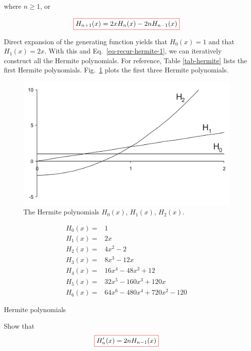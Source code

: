 where $n \geq 1$, or

\begin{equation}
\fbox{$\displaystyle
H_{n+1}(x) = 2 x H_n(x) - 2 n H_{n-1}(x)
$} \label{eq-recur-hermite-1}
\end{equation} 

Direct expansion of the generating function yields that $H_0(x) = 1$ and that $H_1(x) = 2x$. With this and Eq.~\ref{eq-recur-hermite-1}, we can iteratively construct all the Hermite polynomials. For reference, Table \ref{tab-hermite} lists the first Hermite polynomials. Fig.~\ref{fig-hermite} plots the first three Hermite polynomials.

\begin{figure}
\centering
\includegraphics[scale=0.7]{special/figures/hermite}
\caption{The Hermite polynomials $H_0(x)$, $H_1(x)$, $H_2(x)$.}
\label{fig-hermite}
\end{figure}

\begin{table}
\begin{align}
H_0(x) = & 1 \nonumber \\
H_1(x) = & 2x \nonumber \\
H_2(x) = & 4x^2-2 \nonumber \\
H_3(x) = & 8x^3-12x \nonumber \\
H_4(x) = & 16x^4-48x^2+12 \nonumber \\
H_5(x) = & 32x^5-160x^3+120x \nonumber \\
H_6(x) = & 64x^6-480x^4+720x^2-120 \nonumber
\end{align}
\caption{Hermite polynomials}
\label{tab-hermite}
\end{table}  

\begin{sidebar}
\begin{ex}
Show that
$$\fbox{$\displaystyle H_n'(x) = 2nH_{n-1}(x)$}$$ \label{eq-recur-hermite-2}
\end{ex}
\end{sidebar}

